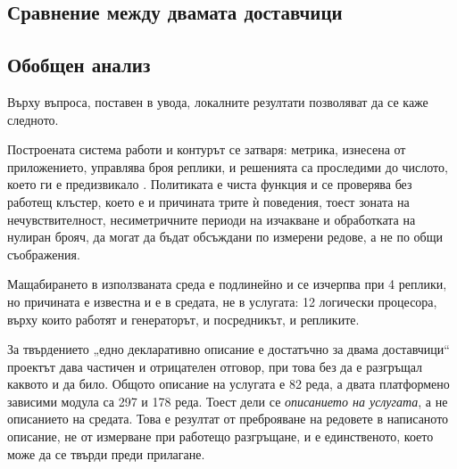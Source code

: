 

\subsection{Сравнение между двамата доставчици}



\subsection{Обобщен анализ}

Върху въпроса, поставен в увода, локалните резултати позволяват да се каже следното.

Построената система работи и контурът се затваря: метрика, изнесена от приложението,
управлява броя реплики, и решенията са проследими до числото, което ги е предизвикало
. Политиката е чиста функция и се проверява без работещ клъстер,
което е и причината трите ѝ поведения, тоест зоната на нечувствителност, несиметричните
периоди на изчакване и обработката на нулиран брояч, да могат да бъдат обсъждани по
измерени редове, а не по общи съображения.

Мащабирането в използваната среда е подлинейно и се изчерпва при 4 реплики, но
причината е известна и е в средата, не в услугата: 12 логически процесора, върху които
работят и генераторът, и посредникът, и репликите.

За твърдението „едно декларативно описание е достатъчно за двама доставчици“ проектът
дава частичен и отрицателен отговор, при това без да е разгръщал каквото и да било.
Общото описание на услугата е 82 реда, а двата платформено зависими модула са 297 и 178
реда. Тоест дели се \emph{описанието на услугата}, а не описанието на средата. Това е
резултат от преброяване на редовете в написаното описание, не от измерване при работещо
разгръщане, и е единственото, което може да се твърди преди прилагане.

